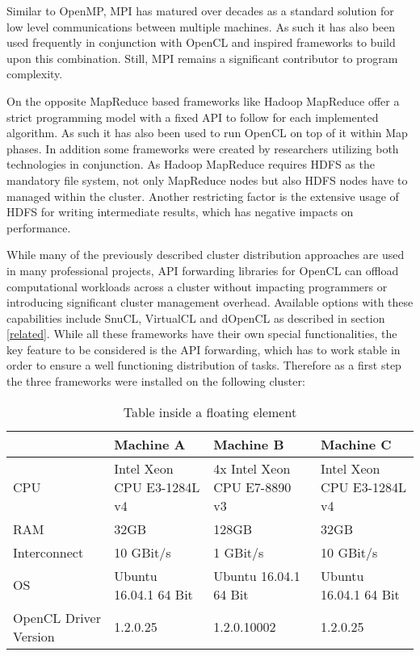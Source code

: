 Similar to OpenMP, MPI has matured over decades as a standard solution for low level communications between multiple machines. As such it has also been used frequently in conjunction with OpenCL and inspired frameworks to build upon this combination. Still, MPI remains a significant contributor to program complexity.

On the opposite MapReduce based frameworks like Hadoop MapReduce offer a strict programming model with a fixed API to follow for each implemented algorithm. As such it has also been used to run OpenCL on top of it within Map phases. In addition some frameworks were created by researchers utilizing both technologies in conjunction. As Hadoop MapReduce requires HDFS as the mandatory file system, not only MapReduce nodes but also HDFS nodes have to managed within the cluster. Another restricting factor is the extensive usage of HDFS for writing intermediate results, which has negative impacts on performance.

While many of the previously described cluster distribution approaches are used in many professional projects, API forwarding libraries for OpenCL can offload computational workloads across a cluster without impacting programmers or introducing significant cluster management overhead. Available options with these capabilities include SnuCL, VirtualCL and dOpenCL as described in section \ref{related}. While all these frameworks have their own special functionalities, the key feature to be considered is the API forwarding, which has to work stable in order to ensure a well functioning distribution of tasks. Therefore as a first step the three frameworks were installed on the following cluster:

\begin{table}[htb]
  \centering
    \begin{adjustbox}{width=1\textwidth}
    \small
    \begin{tabular}{l | l | l | l}
    ~                     & Machine A                   & Machine B                  	& Machine C                  \\
    \hline
    CPU                   & Intel Xeon CPU E3-1284L v4 	& 4x Intel Xeon CPU E7-8890 v3 	& Intel Xeon CPU E3-1284L v4 \\
    RAM                   & 32GB                        & 128GB                       	& 32GB                       \\
    Interconnect          & 10 GBit/s                   & 1 GBit/s                  	& 10 GBit/s                  \\
    OS                    & Ubuntu 16.04.1 64 Bit       & Ubuntu 16.04.1 64 Bit      	& Ubuntu 16.04.1 64 Bit      \\
    OpenCL Driver Version & 1.2.0.25                  	& 1.2.0.10002                   & 1.2.0.25                   \\
    \end{tabular}
    \end{adjustbox}

    \caption{Table inside a floating element}
    \label{table:ta}
\end{table}

